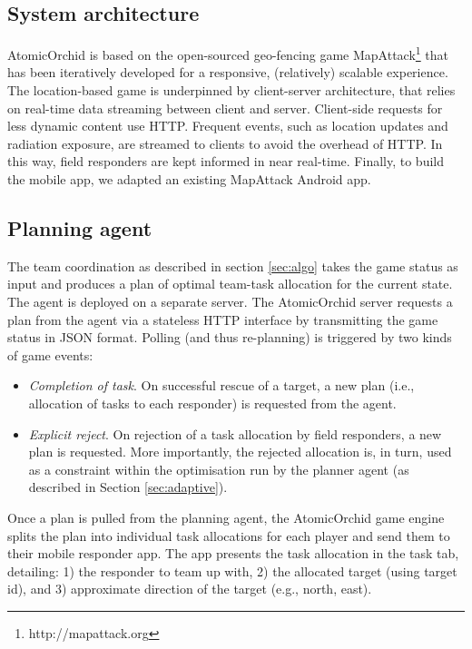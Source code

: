 \subsection{System architecture}
AtomicOrchid is based on the open-sourced geo-fencing game MapAttack\footnote{http://mapattack.org} that has been iteratively developed for a responsive, (relatively) scalable experience.  The location-based game is underpinned by client-server architecture, that relies on real-time data streaming between client and server. Client-side requests for less dynamic content use HTTP. Frequent events, such as location updates and radiation exposure, are streamed to clients to avoid the overhead of HTTP. In this way, field responders are kept informed in near real-time. Finally,  to build the mobile app, we adapted an existing MapAttack Android app.


\subsection{Planning agent}
The team coordination as described in section \ref{sec:algo} takes the game status as input and produces a plan of optimal team-task allocation for the current state. The agent is deployed on a separate server. The AtomicOrchid server requests a plan from the agent via a stateless HTTP interface by transmitting the game status in JSON format. Polling (and thus re-planning) is triggered by two kinds of game events:
\begin{itemize}
\item \textit{Completion of task}. On successful rescue of a target, a new plan (i.e., allocation of tasks to each responder) is requested from the agent.
\item \textit{Explicit reject}. On rejection of a task allocation by field responders, a new plan is requested. More importantly, the rejected allocation is, in turn, used as a constraint within the optimisation run by the planner agent (as described in Section \ref{sec:adaptive}).
\end{itemize} 

Once a plan is pulled from the planning agent, the AtomicOrchid game engine splits the plan into individual task allocations for each player and send them to their mobile responder app. The app presents the task allocation in the task tab, detailing: 1) the responder to team up with, 2) the allocated target (using target id), and 3) approximate direction of the target (e.g., north, east). 

